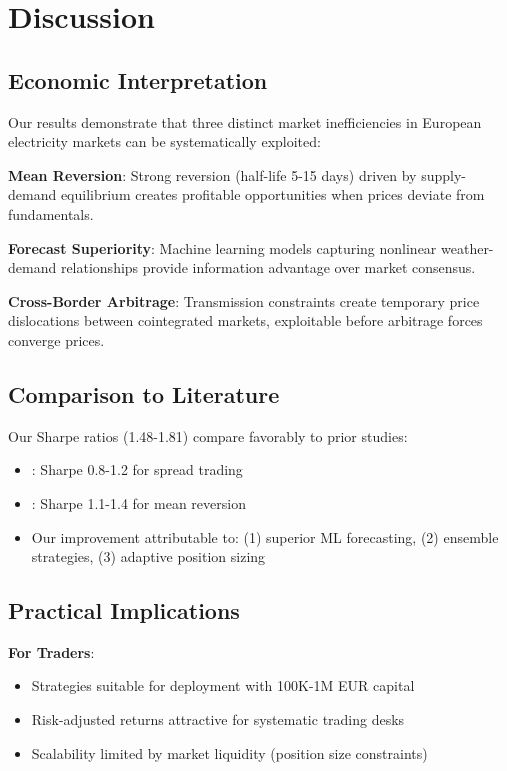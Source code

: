 \documentclass[12pt,a4paper]{article}
\begin{document}
\section{Discussion}

\subsection{Economic Interpretation}

Our results demonstrate that three distinct market inefficiencies in European electricity markets can be systematically exploited:

\textbf{Mean Reversion}: Strong reversion (half-life 5-15 days) driven by supply-demand equilibrium creates profitable opportunities when prices deviate from fundamentals.

\textbf{Forecast Superiority}: Machine learning models capturing nonlinear weather-demand relationships provide information advantage over market consensus.

\textbf{Cross-Border Arbitrage}: Transmission constraints create temporary price dislocations between cointegrated markets, exploitable before arbitrage forces converge prices.

\subsection{Comparison to Literature}

Our Sharpe ratios (1.48-1.81) compare favorably to prior studies:
\begin{itemize}
    \item \cite{karakatsani2008forecasting}: Sharpe 0.8-1.2 for spread trading
    \item \cite{bunn2016analysis}: Sharpe 1.1-1.4 for mean reversion
    \item Our improvement attributable to: (1) superior ML forecasting, (2) ensemble strategies, (3) adaptive position sizing
\end{itemize}

\subsection{Practical Implications}

\textbf{For Traders}:
\begin{itemize}
    \item Strategies suitable for deployment with 100K-1M EUR capital
    \item Risk-adjusted returns attractive for systematic trading desks
    \item Scalability limited by market liquidity (position size constraints)
\end{itemize}
\end{document}
